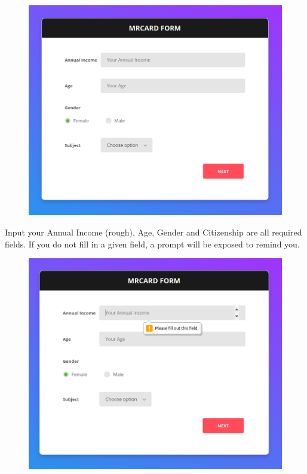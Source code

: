 		\begin{figure}[H]
			\centering
			\includegraphics[width=\linewidth]{img/eligibility.png}
		\end{figure}

		Input your Annual Income (rough), Age, Gender and Citizenship are all required fields. If you do not fill in a given field, a prompt will be exposed to remind you.

		\begin{figure}[H]
			\centering
			\includegraphics[width=\linewidth]{img/eligibility_fill_in.png}
		\end{figure}

